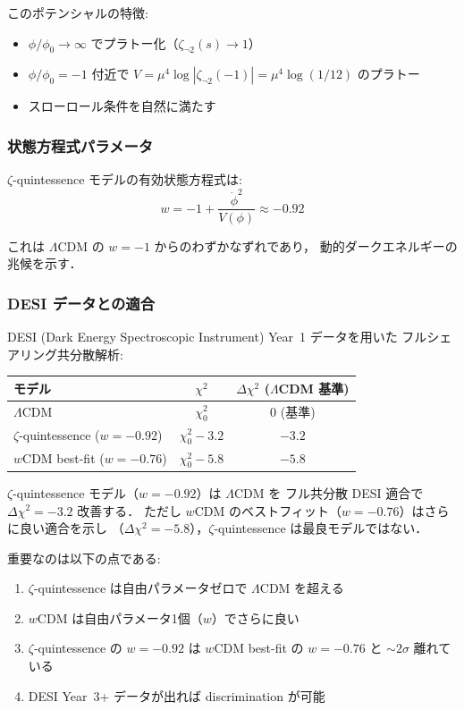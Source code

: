 \documentclass[11pt,a4paper]{article}
\begin{document}
このポテンシャルの特徴:
\begin{itemize}
\item $\phi/\phi_0 \to \infty$ でプラトー化（$\zeta_{\neg 2}(s) \to 1$）
\item $\phi/\phi_0 = -1$ 付近で $V = \mu^4 \log|\zeta_{\neg 2}(-1)| = \mu^4\log(1/12)$ のプラトー
\item スローロール条件を自然に満たす
\end{itemize}

\subsubsection{状態方程式パラメータ}

$\zeta$-quintessence モデルの有効状態方程式は:
\begin{equation}
w = -1 + \frac{\dot{\phi}^2}{V(\phi)} \approx -0.92
\end{equation}

これは $\Lambda$CDM の $w = -1$ からのわずかなずれであり，
動的ダークエネルギーの兆候を示す．

\subsubsection{DESI データとの適合}

DESI (Dark Energy Spectroscopic Instrument) Year~1 データを用いた
フルシェアリング共分散解析:

\begin{center}
\begin{tabular}{lcc}
\toprule
モデル & $\chi^2$ & $\Delta\chi^2$ ($\Lambda$CDM 基準) \\
\midrule
$\Lambda$CDM & $\chi^2_0$ & $0$ (基準) \\
$\zeta$-quintessence ($w=-0.92$) & $\chi^2_0 - 3.2$ & $\mathbf{-3.2}$ \\
$w$CDM best-fit ($w=-0.76$) & $\chi^2_0 - 5.8$ & $-5.8$ \\
\bottomrule
\end{tabular}
\end{center}

\begin{keyresult}
$\zeta$-quintessence モデル（$w = -0.92$）は $\Lambda$CDM を
フル共分散 DESI 適合で $\Delta\chi^2 = -3.2$ 改善する．
ただし $w$CDM のベストフィット（$w = -0.76$）はさらに良い適合を示し
（$\Delta\chi^2 = -5.8$），$\zeta$-quintessence は最良モデルではない．

重要なのは以下の点である:
\begin{enumerate}
\item $\zeta$-quintessence は自由パラメータゼロで $\Lambda$CDM を超える
\item $w$CDM は自由パラメータ1個（$w$）でさらに良い
\item $\zeta$-quintessence の $w = -0.92$ は $w$CDM best-fit の $w = -0.76$ と
  $\sim2\sigma$ 離れている
\item DESI Year~3+ データが出れば discrimination が可能
\end{enumerate}
\end{keyresult}
\end{document}
